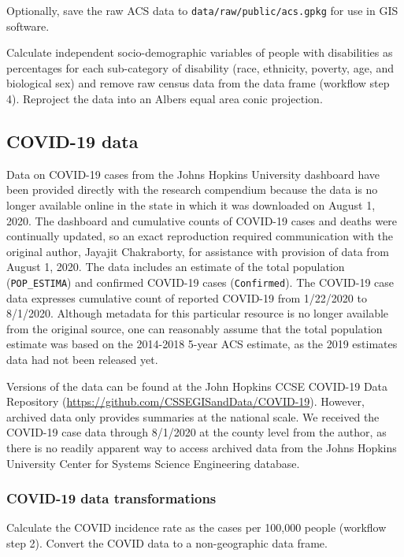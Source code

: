 \documentclass[
]{article}
\begin{document}
Optionally, save the raw ACS data to \texttt{data/raw/public/acs.gpkg}
for use in GIS software.

Calculate independent socio-demographic variables of people with
disabilities as percentages for each sub-category of disability (race,
ethnicity, poverty, age, and biological sex) and remove raw census data
from the data frame (workflow step 4). Reproject the data into an Albers
equal area conic projection.

\hypertarget{covid-19-data}{%
\subsection{COVID-19 data}\label{covid-19-data}}

Data on COVID-19 cases from the Johns Hopkins University dashboard have
been provided directly with the research compendium because the data is
no longer available online in the state in which it was downloaded on
August 1, 2020. The dashboard and cumulative counts of COVID-19 cases
and deaths were continually updated, so an exact reproduction required
communication with the original author, Jayajit Chakraborty, for
assistance with provision of data from August 1, 2020. The data includes
an estimate of the total population (\texttt{POP\_ESTIMA}) and confirmed
COVID-19 cases (\texttt{Confirmed}). The COVID-19 case data expresses
cumulative count of reported COVID-19 from 1/22/2020 to 8/1/2020.
Although metadata for this particular resource is no longer available
from the original source, one can reasonably assume that the total
population estimate was based on the 2014-2018 5-year ACS estimate, as
the 2019 estimates data had not been released yet.

Versions of the data can be found at the John Hopkins CCSE COVID-19 Data
Repository (\url{https://github.com/CSSEGISandData/COVID-19}). However,
archived data only provides summaries at the national scale. We received
the COVID-19 case data through 8/1/2020 at the county level from the
author, as there is no readily apparent way to access archived data from
the Johns Hopkins University Center for Systems Science Engineering
database.

\hypertarget{covid-19-data-transformations}{%
\subsubsection{COVID-19 data
transformations}\label{covid-19-data-transformations}}

Calculate the COVID incidence rate as the cases per 100,000 people
(workflow step 2). Convert the COVID data to a non-geographic data
frame.
\end{document}
